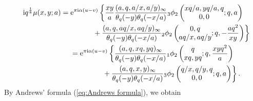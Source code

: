 \documentclass[pdftex]{sigma}
\numberwithin{equation}{section}
\theoremstyle{definition}
\begin{document}
\begin{gather*}
{\rm i}q^{\frac{1}{8}}\mu(x,y;a)
 =
 {\rm e}^{\pi{\rm i}\alpha(u-v)}\left\{\frac{xy}{a}\frac{(a,q,a/x,a/y)_\infty}{\theta_q(-y)\theta_q(-x/a)}
 {}_3\phi_2\left(\begin{matrix}xq/a,yq/a,q \\ 0,0 \end{matrix};q,a\right) \right. \nonumber\\
\left.
\hphantom{{\rm i}q^{\frac{1}{8}}\mu(x,y;a) = {\rm e}^{\pi{\rm i}\alpha(u-v)}}{}
 +\frac{(a,q,aq/x,aq/y)_\infty}{\theta_q(-y)\theta_q(-x/a)}{}_2\phi_2\left(\begin{matrix}0,q \\ aq/x,aq/y \end{matrix};q,-\frac{aq^2}{xy}\right)\right\} \\
\hphantom{{\rm i}q^{\frac{1}{8}}\mu(x,y;a)}{}
=
 {\rm e}^{\pi{\rm i}\alpha(u-v)}\left\{\frac{(a,q,xq,yq)_\infty}{\theta_q(-y)\theta_q(-x/a)}{}_1\phi_2\left(\begin{matrix}q \\ xq,yq \end{matrix};q,\frac{xyq^2}{a}\right) \right. \nonumber\\
\left.
\hphantom{{\rm i}q^{\frac{1}{8}}\mu(x,y;a) = {\rm e}^{\pi{\rm i}\alpha(u-v)}}{}
 +\frac{(a,q,x,y)_\infty}{\theta_q(-y)\theta_q(-x/a)}{}_3\phi_2\left(\begin{matrix}q/x,q/y,q \\ 0,0 \end{matrix};q,a\right)\right\}.
\end{gather*}
By Andrews' formula (\ref{eq:Andrews formula}), we obtain
\end{document}
